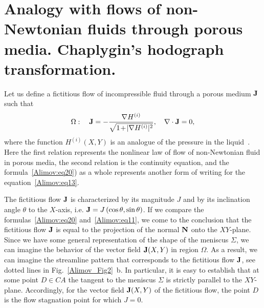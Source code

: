 \documentclass[
11pt,%
tightenlines,%
twoside,%
onecolumn,%
nofloats,%
nobibnotes,%
nofootinbib,%
superscriptaddress,%
noshowpacs,%
centertags]%
{revtex4-2}
\begin{document}
\section{Analogy with flows of non-Newtonian fluids through porous media. Chaplygin's hodograph
transformation.} \label{Alimov:sec3}
 Let us define a fictitious flow of incompressible fluid
through a porous medium ${\rm {\bf J}}$ such that
\begin{equation}
\label{Alimov:eq20} \Omega :\quad {\rm {\bf J}} = - \frac{\nabla H^{(i)}}{\sqrt
{1\hspace{-0.5mm}+\hspace{-0.5mm} \vert \nabla H^{(i)}\vert^2} },\quad \nabla \cdot {\rm {\bf J}}=0,
\end{equation}
where the function $H^{(i)}(X,Y)$ is an analogue of the pressure in the
liquid~\cite{Alimov:bib16}. Here the first relation represents the nonlinear law of flow of
non-Newtonian fluid in porous media, the second relation is the continuity equation, and the
formula~\eqref{Alimov:eq20}) as a whole represents another form of writing for the
equation~\eqref{Alimov:eq13}.

The fictitious flow ${\rm {\bf J}}$ is characterized by its magnitude $J$ and by its inclination
angle $\theta$ to the $X$-axis, i.e. ${\rm {\bf J}} = J\left( {\cos \theta, \sin \theta} \right)$.
If we compare the formulas~\eqref{Alimov:eq20} and~\eqref{Alimov:eq11}, we come to the conclusion
that the fictitious flow ${\rm {\bf J}}$ is equal to the projection of the normal ${\rm {\bf N}}$
onto the $XY$-plane. Since we have some general representation of the shape of the meniscus
$\Sigma$, we can imagine the behavior of the vector field ${\rm {\bf J}}(X,Y)$ in region $\Omega$.
As a result, we can imagine the streamline pattern that corresponds to the fictitious flow ${\rm
{\bf J}}$, see dotted lines in Fig.~\ref{Alimov_Fig2}~b. In particular, it is easy to establish that
at some point $D \in CA$ the tangent to the meniscus $\Sigma$ is strictly parallel to the
$XY$-plane. Accordingly, for the vector field ${\rm {\bf J}}(X,Y)$ of the fictitious flow, the
point $D$ is the flow stagnation point for which $J = 0$.
\end{document}
